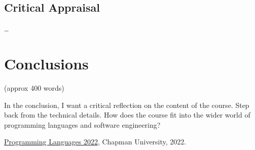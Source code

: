 \documentclass{article}
\theoremstyle{theorem}
\theoremstyle{definition}
\theoremstyle{remark}
\begin{document}
\subsection{Critical Appraisal}

\ldots

\section{Conclusions}\label{conclusions}

(approx 400 words)

In the conclusion, I want a critical reflection on the content of the course. Step back from the technical details. How does the course fit into the wider world of programming languages and software engineering?

\begin{thebibliography}{99}
 \href{https://github.com/alexhkurz/programming-languages-2022/blob/main/README.md}{Programming Languages 2022}, Chapman University, 2022.
\end{thebibliography}
\end{document}
